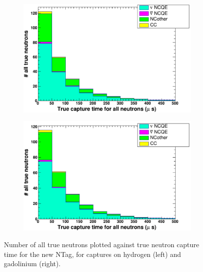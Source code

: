 \begin{figure}
    \centering
     \begin{subfigure}[b]{0.49\linewidth}
      \includegraphics[width=\linewidth]{Figures/TruCapTimeReductionNewH.PNG}
     \end{subfigure}
     \begin{subfigure}[b]{0.49\linewidth}
       \includegraphics[width=\linewidth]{Figures/TruCapTimeReductionNewGd.PNG}
      \end{subfigure} 
      \caption{Number of all true neutrons plotted against true neutron capture time for the new NTag, for captures on hydrogen (left) and gadolinium (right).}
      \label{fig:TruCapTimeReductionNewHGd} 
\end{figure}


